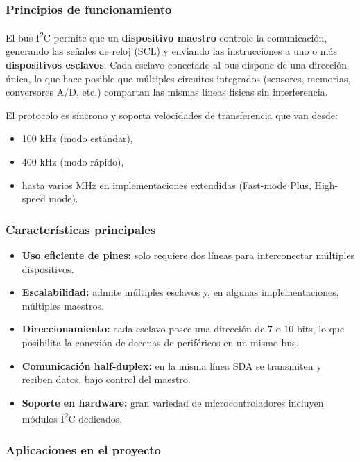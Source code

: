 \subsubsection*{Principios de funcionamiento}

El bus I\textsuperscript{2}C permite que un \textbf{dispositivo maestro} controle la comunicación, generando las señales de reloj (SCL) y enviando las instrucciones a uno o más \textbf{dispositivos esclavos}. Cada esclavo conectado al bus dispone de una dirección única, lo que hace posible que múltiples circuitos integrados (sensores, memorias, conversores A/D, etc.) compartan las mismas líneas físicas sin interferencia. 

El protocolo es síncrono y soporta velocidades de transferencia que van desde:
\begin{itemize}
    \item 100 kHz (modo estándar),
    \item 400 kHz (modo rápido),
    \item hasta varios MHz en implementaciones extendidas (Fast-mode Plus, High-speed mode).
\end{itemize}

\subsubsection*{Características principales}

\begin{itemize}
    \item \textbf{Uso eficiente de pines:} solo requiere dos líneas para interconectar múltiples dispositivos.
    \item \textbf{Escalabilidad:} admite múltiples esclavos y, en algunas implementaciones, múltiples maestros.
    \item \textbf{Direccionamiento:} cada esclavo posee una dirección de 7 o 10 bits, lo que posibilita la conexión de decenas de periféricos en un mismo bus.
    \item \textbf{Comunicación half-duplex:} en la misma línea SDA se transmiten y reciben datos, bajo control del maestro.
    \item \textbf{Soporte en hardware:} gran variedad de microcontroladores incluyen módulos I\textsuperscript{2}C dedicados.
\end{itemize}

\subsubsection*{Aplicaciones en el proyecto}

